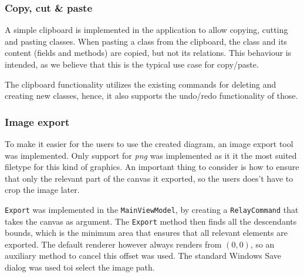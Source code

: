 \subsubsection{Copy, cut \& paste}

A simple clipboard is implemented in the
application to allow copying, cutting and pasting classes. When pasting a class
from the clipboard, the class and its content (fields and methods) are copied,
but not its relations. This behaviour is intended, as we believe that this is
the typical use case for copy/paste.

The clipboard functionality utilizes the existing commands for deleting and
creating new classes, hence, it also supports the undo/redo functionality of
those.


\subsubsection{Image export}

To make it easier for the users to use the created diagram, an image export tool
was implemented. Only support for \textit{png} was implemented as it it
the most suited filetype for this kind of graphics. An important thing to consider
is how to ensure that only the relevant part of the canvas it exported, so
the users does't have to crop the image later.

\texttt{Export} was implemented in the \texttt{MainViewModel}, by creating a
\texttt{RelayCommand} that takes the canvas as argument.
The \texttt{Export} method then finds all the  descendants bounds, which is 
the minimum area that ensures that all relevant elements are exported. The
default renderer however always renders from $(0,0)$, so an auxiliary method to
cancel this offset was used. The standard Windows Save dialog was used toi
select the image path.

